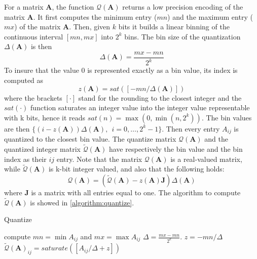  For a matrix $\mathbf{A}$, the function $\mathcal{Q}(\mathbf{A})$ returns a low precision encoding of the matrix $\mathbf{A}$. It first computes the minimum entry ($mn$) and the maximum entry ($mx$) of the matrix $\mathbf{A}$. Then, given $k$ bits it builds a linear binning of the continuous interval $[mn,mx]$ into $2^k$ bins. The bin size of the quantization $\Delta(\mathbf{A})$ is then \[\Delta(\mathbf{A}) = \frac{mx - mn}{2^k}\] To insure that the value $0$ is represented exactly as a bin value, its index is computed as \[z(\mathbf{A}) = sat([-mn/\Delta(\mathbf{A})])\] where the brackets $[\cdot]$ stand for the rounding to the closest integer and the $sat(\cdot)$ function saturates an integer value into the integer value representable with k bits, hence it reads $sat(n) = \max(0, \min(n,2^k) )$. The bin values are then $\{ (i-z(\mathbf{A})) \Delta(\mathbf{A}), \ \ i = 0, \dots, 2^k -1 \}$. Then every entry $A_{ij}$ is quantized to the closest bin value. The quantize matrix  $\mathcal{Q}(\mathbf{A})$ and the quantized integer matrix $\tilde{\mathcal{Q}}(\mathbf{A})$ have respectively the bin value and the bin index as their $ij$ entry. Note that the matrix $\mathcal{Q}(\mathbf{A})$ is a real-valued matrix, while $\tilde{\mathcal{Q}}(\mathbf{A})$ is k-bit integer valued, and also that the following holds:
\begin{equation}\label{equation:affine_transf}
\mathcal{Q}(\mathbf{A}) = (\tilde{\mathcal{Q}}(\mathbf{A}) -z(\mathbf{A}) \mathbf{J}  ) \Delta(\mathbf{A})
\end{equation} 
where $\mathbf{J}$ is a matrix with all entries equal to one. The algorithm to compute $\tilde{\mathcal{Q}}(\mathbf{A})$  is showed in \cref{algorithm:quantize}.

\begin{algorithm}
	\caption{Quantize}\label{algorithm:quantize}
	\begin{algorithmic}[1]
		\State compute $mn = \min A_{ij}$ and $mx = \max A_{ij}$
		\State $\Delta = \frac{mx - mn}{2^k}$.
		\State $z = -mn/\Delta$
			\State $\tilde{\mathcal{Q}}(\mathbf{A})_{ij} = saturate([A_{ij}/\Delta + z ])$ 
		\EndFor
	\end{algorithmic}
\end{algorithm}

